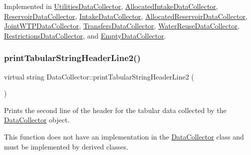 Implemented in \mbox{\hyperlink{classUtilitiesDataCollector_a796aa9d7637d8ed04dbd949ca2a34088}{Utilities\+Data\+Collector}}, \mbox{\hyperlink{classAllocatedIntakeDataCollector_ab4149a988e728ce54f89058f8f18dd18}{Allocated\+Intake\+Data\+Collector}}, \mbox{\hyperlink{classReservoirDataCollector_a62e7c7abc34c8154b338dfbd284ed665}{Reservoir\+Data\+Collector}}, \mbox{\hyperlink{classIntakeDataCollector_ae17ab7e6c75e77f5981f6a682597bb5c}{Intake\+Data\+Collector}}, \mbox{\hyperlink{classAllocatedReservoirDataCollector_ae82c7a68af1dce9003cccc6da1800e28}{Allocated\+Reservoir\+Data\+Collector}}, \mbox{\hyperlink{classJointWTPDataCollector_a6b9ba2992f4a9c3a900ad675b8301d07}{Joint\+W\+T\+P\+Data\+Collector}}, \mbox{\hyperlink{classTransfersDataCollector_a7c797fbccf4326b206b29529059dd622}{Transfers\+Data\+Collector}}, \mbox{\hyperlink{classWaterReuseDataCollector_a1065ad3627b913dccb6ecbf0e6acc6e6}{Water\+Reuse\+Data\+Collector}}, \mbox{\hyperlink{classRestrictionsDataCollector_a2676a6693b254997d223fc1c437258ab}{Restrictions\+Data\+Collector}}, and \mbox{\hyperlink{classEmptyDataCollector_afa47b48abb2ed59c16f1253e55f93cf2}{Empty\+Data\+Collector}}.

\mbox{\label{classDataCollector_af01ea961314be2164f39e6d4cd59e443}} 
\subsubsection{\texorpdfstring{print\+Tabular\+String\+Header\+Line2()}{printTabularStringHeaderLine2()}}
{\footnotesize\ttfamily virtual string Data\+Collector\+::print\+Tabular\+String\+Header\+Line2 (\begin{DoxyParamCaption}{ }\end{DoxyParamCaption})\hspace{0.3cm}{\ttfamily [pure virtual]}}



Prints the second line of the header for the tabular data collected by the \mbox{\hyperlink{classDataCollector}{Data\+Collector}} object. 

This function does not have an implementation in the \mbox{\hyperlink{classDataCollector}{Data\+Collector}} class and must be implemented by derived classes.

